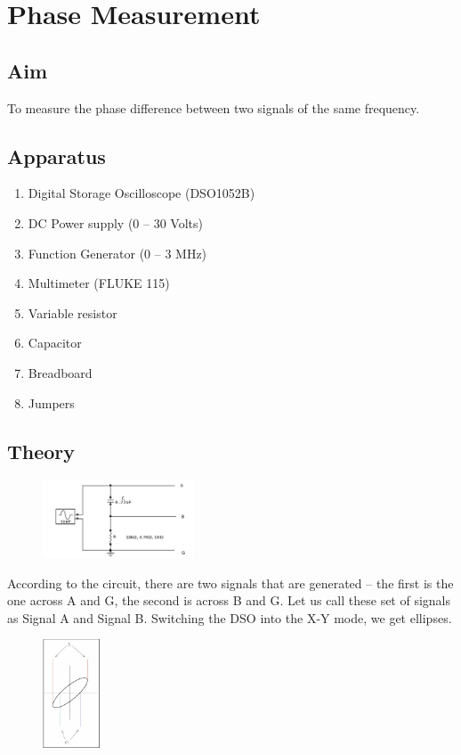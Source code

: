 \documentclass{article}
\begin{document}
\section{Phase Measurement}
\subsection{Aim}
To measure the phase difference between two signals of the same frequency.

\subsection{Apparatus}
\begin{enumerate}
    \item Digital Storage Oscilloscope (DSO1052B)
    \item DC Power supply (0 – 30 Volts)
    \item Function Generator (0 – 3 MHz)
    \item Multimeter (FLUKE 115)
    \item Variable resistor
    \item Capacitor
    \item Breadboard
    \item Jumpers
\end{enumerate}

\subsection{Theory}
\begin{figure}
\includegraphics[width=0.4\textwidth]{3Theory.png}
\end{figure}
According to the circuit, there are two signals that are generated – the first is the one across A and G, the second is across B and G. Let us call these set of signals as Signal A and Signal B. Switching the DSO into the X-Y mode, we get ellipses.
\begin{figure}
\includegraphics[width=0.15\textwidth]{3.1 Theory.png}
\end{figure}
\end{document}
